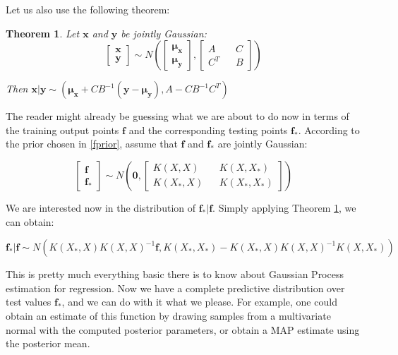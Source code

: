 \documentclass[10pt,a4paper,twoside]{book}
\newtheorem{mydef}{Theorem}
\begin{document}
Let us also use the following theorem:

\begin{mydef}
\label{conditioning}
Let $\boldsymbol{x}$ and $\boldsymbol{y}$ be jointly Gaussian:
\begin{equation}
\begin{bmatrix}
\boldsymbol{x}\\
\boldsymbol{y}
\end{bmatrix} \sim N\left(
\begin{bmatrix}
\boldsymbol{\mu_x}\\
\boldsymbol{\mu_y}
\end{bmatrix},
\begin{bmatrix}
A   && C \\
C^T && B
\end{bmatrix}
\right)
\end{equation}

Then $\boldsymbol{x|y} \sim \left(\boldsymbol{\mu_x} + C B^{-1}(\boldsymbol{y} - \boldsymbol{\mu_y}), A - CB^{-1}C^T \right)$
\end{mydef}

The reader might already be guessing what we are about to do now in terms of the training output points $\boldsymbol{f}$ and the corresponding testing points $\boldsymbol{f_*}$. According to the prior chosen in \ref{fprior}, assume that $\boldsymbol{f}$ and $\boldsymbol{f_*}$ are jointly Gaussian:

\begin{equation}
\begin{bmatrix}
\boldsymbol{f}\\
\boldsymbol{f_*}
\end{bmatrix} \sim N\left(
\boldsymbol{0},
\begin{bmatrix}
K(X, X)  && K(X, X_*) \\
K(X_*, X) && K(X_*, X_*)
\end{bmatrix}
\right)
\end{equation}


We are interested now in the distribution of $\boldsymbol{f_{*}}|\boldsymbol{f}$. Simply applying Theorem \ref{conditioning}, we can obtain:

\begin{equation}
\boldsymbol{f_*|f} \sim N\left(K(X_*, X)K(X, X)^{-1}\boldsymbol{f}, K(X_*, X_*) - K(X_*, X)K(X, X)^{-1}K(X, X_*) \right)
\end{equation}

This is pretty much everything basic there is to know about Gaussian Process estimation for regression. Now we have a complete predictive distribution over test values $\boldsymbol{f_{*}}$, and we can do with it what we please. For example, one could obtain an estimate of this function by drawing samples from a multivariate normal with the computed posterior parameters, or obtain a MAP estimate using the posterior mean.\\
\end{document}
